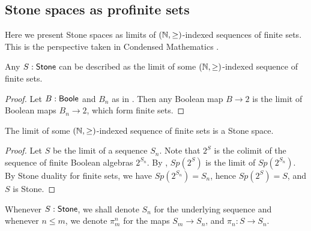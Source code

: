 
\subsection{Stone spaces as profinite sets}
Here we present Stone spaces as limits of $(\mathbb{N},\geq)$-indexed sequences of finite sets. 
This is the perspective taken in Condensed Mathematics \cite{Condensed,Dagur,Scholze}.
\begin{lemma}
  Any $S:\mathsf{Stone}$ can be described as the limit of some $(\mathbb{N},\geq)$-indexed sequence of 
  finite sets. 
\end{lemma}
\begin{proof}
  Let $B:\mathsf{Boole}$ and $B_n$ as in . 
  Then any Boolean map $B\to 2$ is the limit of Boolean maps $B_n \to 2$, 
  which form finite sets.
\end{proof}
\begin{lemma}\label{StoneAreProfinite}
  The limit of some $(\mathbb{N},\geq)$-indexed sequence of finite sets is a Stone space. 
\end{lemma}
\begin{proof}
  Let $S$ be the limit of a sequence $S_n$. 
  Note that $2^S$ is the colimit of the sequence of finite Boolean algebras $2^{S_n}$.
  By , $Sp(2^S)$ is the limit of $Sp(2^{S_n})$.
  By Stone duality for finite sets, we have $Sp(2^{S_n}) = S_n$, hence $Sp(2^S) = S$, 
  and $S$ is Stone. 
\end{proof}
\begin{remark}
  Whenever $S:\mathsf{Stone}$, we shall denote $S_n$ for the underlying sequence 
  and whenever $n\leq m$, we denote $\pi_m^n$ for the maps $S_m \to S_n$, 
  and $\pi_n:S\to S_n$. 
\end{remark}


